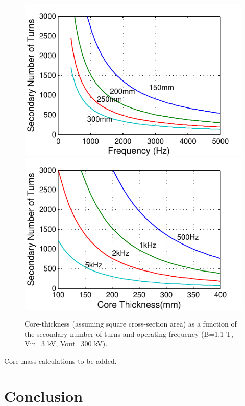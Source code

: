 \documentclass[a4paper, 11pt]{article} %
\begin{document}
\begin{figure}[]
  \centering
    \includegraphics[]{secondary_Nturns_core}
    \includegraphics[]{secondary_Nturns_freq}
   \caption{Core-thickness (assuming square cross-section area) as a function of the secondary number of turns and operating frequency (B=1.1 T, Vin=3 kV, Vout=300 kV).}
  \label{secondary_core_dimensions}
\end{figure}


Core mass calculations to be added.

\section{Conclusion}



\clearpage


\end{document}
